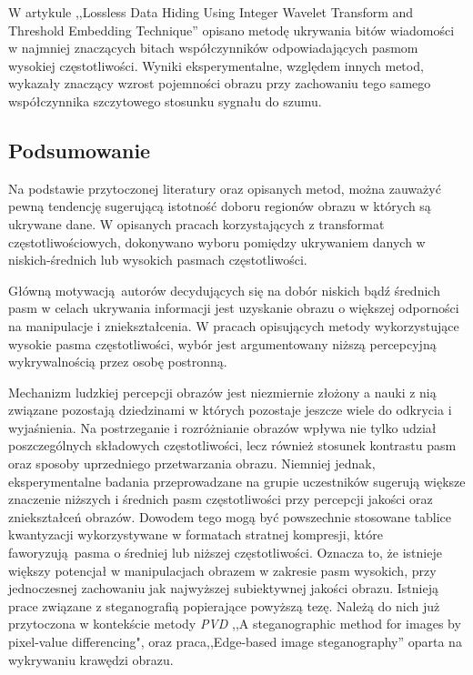 {{{            W artykule ,,Lossless Data Hiding Using Integer Wavelet Transform and Threshold Embedding Technique''
            opisano metodę ukrywania bitów wiadomości w najmniej znaczących bitach współczynników odpowiadających pasmom
            wysokiej częstotliwości. Wyniki eksperymentalne, względem innych metod, wykazały znaczący wzrost pojemności
            obrazu przy zachowaniu tego samego współczynnika szczytowego stosunku sygnału do
            szumu\cite{Xuan2005LosslessDH}.
        }

        \subsection{Podsumowanie}
        {
            Na podstawie przytoczonej literatury oraz opisanych metod, można zauważyć pewną tendencję sugerującą
            istotność doboru regionów obrazu w których są ukrywane dane. W opisanych pracach korzystających z
            transformat częstotliwościowych, dokonywano wyboru pomiędzy ukrywaniem danych w
            niskich-średnich\cite{Huang2000EmbeddingIW, DataHidinginJPEG, Li2007ASM} lub wysokich pasmach
            częstotliwości\cite{Xuan2005LosslessDH, Muhuri2020ANI}. 
            
            Główną motywacją autorów decydujących się na dobór niskich bądź średnich pasm w celach ukrywania informacji
            jest uzyskanie obrazu o większej odporności na manipulacje i zniekształcenia. W pracach opisujących metody
            wykorzystujące wysokie pasma częstotliwości, wybór jest argumentowany niższą percepcyjną wykrywalnością
            przez osobę postronną.

            Mechanizm ludzkiej percepcji obrazów jest niezmiernie złożony a nauki z nią związane pozostają dziedzinami w
            których pozostaje jeszcze wiele do odkrycia i wyjaśnienia. Na postrzeganie i rozróżnianie obrazów wpływa nie
            tylko udział poszczególnych składowych częstotliwości, lecz również stosunek kontrastu pasm oraz sposoby
            uprzedniego przetwarzania obrazu\cite{Perfetto2020EffectsOS}. Niemniej jednak, eksperymentalne badania
            przeprowadzane na grupie uczestników sugerują większe znaczenie niższych i średnich pasm częstotliwości przy
            percepcji jakości oraz zniekształceń obrazów. Dowodem tego mogą być powszechnie stosowane tablice
            kwantyzacji wykorzystywane w formatach stratnej kompresji, które faworyzują pasma o średniej lub niższej
            częstotliwości\cite{ImageCompressionDCT}. Oznacza to, że istnieje większy potencjał w manipulacjach obrazem
            w zakresie pasm wysokich, przy jednoczesnej zachowaniu jak najwyższej subiektywnej jakości obrazu. Istnieją
            prace związane z steganografią popierające powyższą tezę. Należą do nich już przytoczona w kontekście metody
            \textit{PVD} ,,A steganographic method for images by pixel-value differencing"\cite{Wu2003ASM}, oraz
            praca,,Edge-based image steganography''  oparta na wykrywaniu krawędzi obrazu\cite{Islam2014EdgebasedIS}.
        }
    }
}

